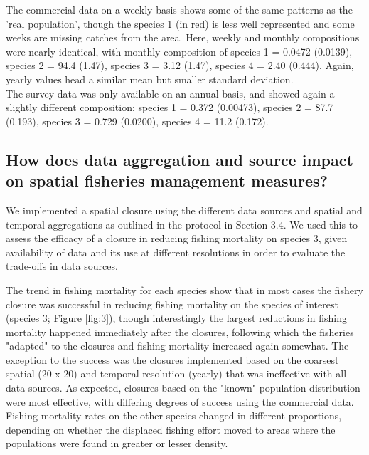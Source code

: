 \documentclass[review]{elsarticle}
\begin{document}
The commercial data on a weekly basis shows some of the same patterns as the
'real population', though the species 1 (in red) is less well represented and
some weeks are missing catches from the area. Here, weekly and monthly
compositions were nearly identical, with monthly composition of species 1 =
0.0472 (0.0139), species 2 = 94.4 (1.47), species 3 = 3.12 (1.47), species 4 =
2.40 (0.444). Again, yearly values head a similar mean but smaller standard
deviation.\\

The survey data was only available on an annual basis, and showed again a
slightly different composition; species 1 = 0.372 (0.00473), species 2 = 87.7
(0.193), species 3 = 0.729 (0.0200), species 4 = 11.2 (0.172).

\subsection{How does data aggregation and source impact on spatial fisheries
	management measures?}

We implemented a spatial closure using the different data sources and spatial
and temporal aggregations as outlined in the protocol in Section 3.4. We used
this to assess the efficacy of a closure in reducing fishing mortality on
species 3, given availability of data and its use at different resolutions in
order to evaluate the trade-offs in data sources. 

The trend in fishing mortality for each species show that in most cases the
fishery closure was successful in reducing fishing mortality on the species of
interest (species 3; Figure \ref{fig:3}), though interestingly the largest
reductions in fishing mortality happened immediately after the closures,
following which the fisheries "adapted" to the closures and fishing mortality
increased again somewhat. The exception to the success was the closures
implemented based on the coarsest spatial (20 x 20) and temporal resolution
(yearly) that was ineffective with all data sources. As expected, closures
based on the "known" population distribution were most effective, with
differing degrees of success using the commercial data. Fishing mortality rates
on the other species changed in different proportions, depending on whether the
displaced fishing effort moved to areas where the populations were found in
greater or lesser density. \\
\end{document}
